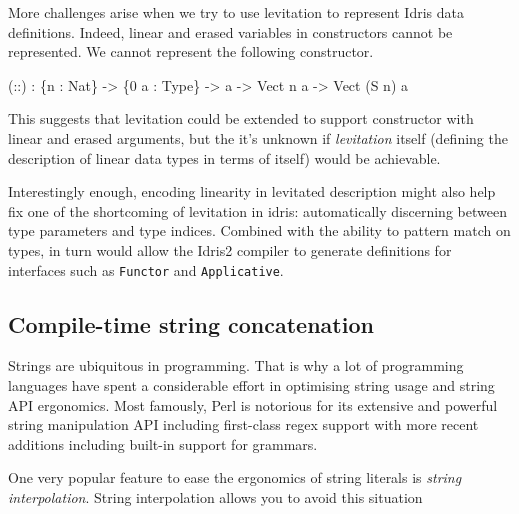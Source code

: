 \documentclass[
]{article}
\newenvironment{Shaded}{}{}
\newcommand{\DataTypeTok}[1]{\textcolor[rgb]{0.56,0.13,0.00}{#1}}
\newcommand{\DecValTok}[1]{\textcolor[rgb]{0.25,0.63,0.44}{#1}}
\newcommand{\NormalTok}[1]{#1}
\newcommand{\OperatorTok}[1]{\textcolor[rgb]{0.40,0.40,0.40}{#1}}
\newcommand{\OtherTok}[1]{\textcolor[rgb]{0.00,0.44,0.13}{#1}}
\begin{document}
More challenges arise when we try to use levitation to represent Idris
data definitions. Indeed, linear and erased variables in constructors
cannot be represented. We cannot represent the following constructor.

\begin{Shaded}
\begin{Highlighting}[]
\NormalTok{(}\OtherTok{::}\NormalTok{) }\OperatorTok{:}\NormalTok{ \{n }\OperatorTok{:} \DataTypeTok{Nat}\NormalTok{\} }\OtherTok{{-}\textgreater{}}\NormalTok{ \{}\DecValTok{0}\NormalTok{ a }\OperatorTok{:} \DataTypeTok{Type}\NormalTok{\} }\OtherTok{{-}\textgreater{}}\NormalTok{ a }\OtherTok{{-}\textgreater{}} \DataTypeTok{Vect}\NormalTok{ n a }\OtherTok{{-}\textgreater{}} \DataTypeTok{Vect}\NormalTok{ (}\DataTypeTok{S}\NormalTok{ n) a }
\end{Highlighting}
\end{Shaded}

This suggests that levitation could be extended to support constructor
with linear and erased arguments, but the it's unknown if
\emph{levitation} itself (defining the description of linear data types
in terms of itself) would be achievable.

Interestingly enough, encoding linearity in levitated description might
also help fix one of the shortcoming of levitation in idris:
automatically discerning between type parameters and type indices.
Combined with the ability to pattern match on types, in turn would allow
the Idris2 compiler to generate definitions for interfaces such as
\texttt{Functor} and \texttt{Applicative}.

\hypertarget{compile-time-string-concatenation}{%
\subsection{Compile-time string
concatenation}\label{compile-time-string-concatenation}}

Strings are ubiquitous in programming. That is why a lot of programming
languages have spent a considerable effort in optimising string usage
and string API ergonomics. Most famously, Perl is notorious for its
extensive and powerful string manipulation API including first-class
regex support with more recent additions including built-in support for
grammars.

One very popular feature to ease the ergonomics of string literals is
\emph{string interpolation}. String interpolation allows you to avoid
this situation
\end{document}
